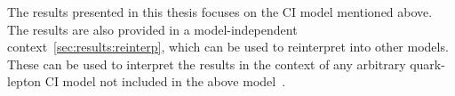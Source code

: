 The results presented in this thesis focuses on the CI model mentioned above. The results are also provided in a model-independent context~\cref{sec:results:reinterp}, which can be used to reinterpret into other models. These can be used to interpret the results in the context of any arbitrary quark-lepton CI model not included in the above model~\cite{de_Blas_2013}.


